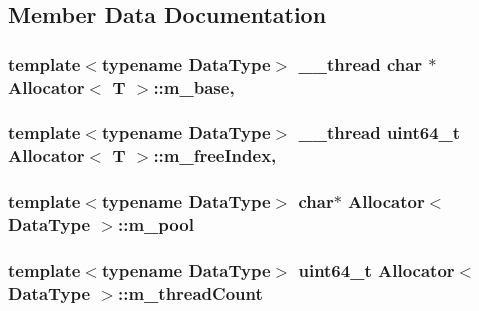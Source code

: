 \subsection{Member Data Documentation}
\hypertarget{classAllocator_a470c76fbdd00585861285728a1d67144}{
\subsubsection[{m\-\_\-base}]{\setlength{\rightskip}{0pt plus 5cm}template$<$typename Data\-Type$>$ \-\_\-\-\_\-thread char $\ast$ {\bf Allocator}$<$ T $>$\-::m\-\_\-base\hspace{0.3cm}{\ttfamily [static]}, {\ttfamily [private]}}}\label{classAllocator_a470c76fbdd00585861285728a1d67144}
\hypertarget{classAllocator_abae17a424e857c97b3ab19e91f27b632}{
\subsubsection[{m\-\_\-free\-Index}]{\setlength{\rightskip}{0pt plus 5cm}template$<$typename Data\-Type$>$ \-\_\-\-\_\-thread uint64\-\_\-t {\bf Allocator}$<$ T $>$\-::m\-\_\-free\-Index\hspace{0.3cm}{\ttfamily [static]}, {\ttfamily [private]}}}\label{classAllocator_abae17a424e857c97b3ab19e91f27b632}
\hypertarget{classAllocator_abb29c2eec72c880e29f9d74dfd4a763c}{
\subsubsection[{m\-\_\-pool}]{\setlength{\rightskip}{0pt plus 5cm}template$<$typename Data\-Type$>$ char$\ast$ {\bf Allocator}$<$ Data\-Type $>$\-::m\-\_\-pool\hspace{0.3cm}{\ttfamily [private]}}}\label{classAllocator_abb29c2eec72c880e29f9d74dfd4a763c}
\hypertarget{classAllocator_a56b1f47232f76bed6e1971119e9e6425}{
\subsubsection[{m\-\_\-thread\-Count}]{\setlength{\rightskip}{0pt plus 5cm}template$<$typename Data\-Type$>$ uint64\-\_\-t {\bf Allocator}$<$ Data\-Type $>$\-::m\-\_\-thread\-Count\hspace{0.3cm}{\ttfamily [private]}}}\label{classAllocator_a56b1f47232f76bed6e1971119e9e6425}
